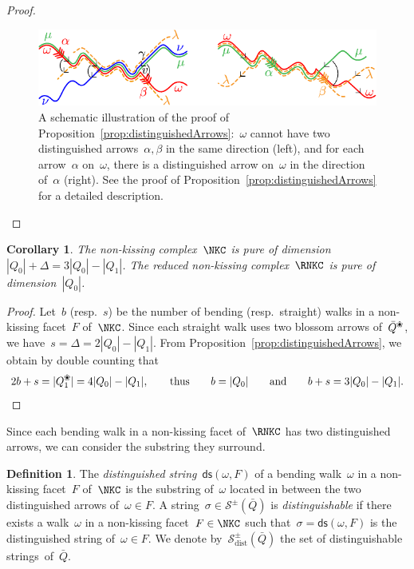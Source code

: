\documentclass{amsart}
\newtheorem{corollary}[theorem]{Corollary}
\theoremstyle{definition}
\newtheorem{definition}[theorem]{Definition}
\newcommand{\darkblue}{\color{darkblue}} %
\newcommand{\defn}[1]{\textsl{\darkblue #1}} %
\newcommand{\blossom}{^\text{\ding{96}}} %
\newcommand{\strings}{\mathcal{S}} %
\newcommand{\distinguishableStrings}{\mathcal{S}_\mathrm{dist}} %
\newcommand{\distinguishedString}[2]{\mathsf{ds}(#1,#2)} %
\begin{document}
\begin{proof}
\begin{figure}[t]
	\capstart
	\centerline{\includegraphics[scale=1]{pure}}
	\caption{A schematic illustration of the proof of Proposition~\ref{prop:distinguishedArrows}:~$\omega$ cannot have two distinguished arrows~$\alpha, \beta$ in the same direction (left), and for each arrow~$\alpha$ on~$\omega$, there is a distinguished arrow on~$\omega$ in the direction of~$\alpha$ (right). See the proof of Proposition~\ref{prop:distinguishedArrows} for a detailed description.}
	\label{fig:pure}
\end{figure}
\end{proof}

\begin{corollary}
\label{coro:pure}
The non-kissing complex~$\NKC$ is pure of dimension~$|Q_0| + \Delta = 3|Q_0|-|Q_1|$. The reduced non-kissing complex~$\RNKC$ is pure of dimension~$|Q_0|$.
\end{corollary}

\begin{proof}
Let~$b$ (resp.~$s$) be the number of bending (resp.~straight) walks in a non-kissing facet~$F$ of~$\NKC$.
Since each straight walk uses two blossom arrows of~$\bar Q\blossom$, we have~$s = \Delta = 2|Q_0|-|Q_1|$.
From Proposition~\ref{prop:distinguishedArrows}, we obtain by double counting that
\[
2b+s = |Q\blossom_1| = 4|Q_0|-|Q_1|,
\qquad\text{thus}\qquad
b = |Q_0|
\qquad\text{and}\qquad
b+s = 3|Q_0|-|Q_1|.
\qedhere
\]
\end{proof}

Since each bending walk in a non-kissing facet of~$\RNKC$ has two distinguished arrows, we can consider the substring they surround.

\begin{definition}
\label{def:distinguishedSubstring}
The \defn{distinguished string}~$\distinguishedString{\omega}{F}$ of a bending walk~$\omega$ in a non-kissing facet~$F$ of~$\NKC$ is the substring of~$\omega$ located in between the two distinguished arrows of~$\omega \in F$.
A string~${\sigma \in \strings^\pm(\bar Q)}$ is \defn{distinguishable} if there exists a walk~$\omega$ in a non-kissing facet~$F \in \NKC$ such that~$\sigma = \distinguishedString{\omega}{F}$ is the distinguished string of~$\omega \in F$.
We denote by~$\distinguishableStrings^\pm(\bar Q)$ the set of distinguishable strings~of~$\bar Q$.
\end{definition}
\end{document}
